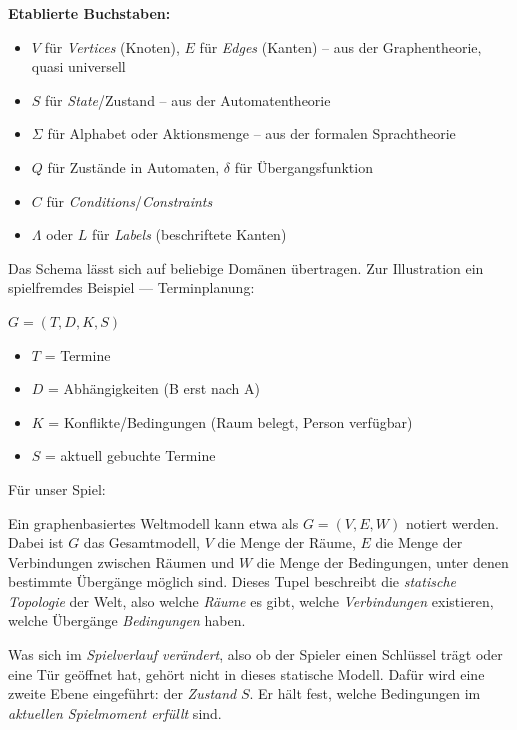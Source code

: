 \documentclass[parskip=half,a4paper,11pt]{scrreprt}
\begin{document}
\textbf{Etablierte Buchstaben:}

\begin{itemize}
    \item $V$ für \textit{Vertices} (Knoten), $E$ für \textit{Edges} (Kanten) – aus der Graphentheorie, quasi universell
    \item $S$ für \textit{State}/Zustand – aus der Automatentheorie
    \item $\Sigma$ für Alphabet oder Aktionsmenge – aus der formalen Sprachtheorie
    \item $Q$ für Zustände in Automaten, $\delta$ für Übergangsfunktion
    \item $C$ für \textit{Conditions}/\textit{Constraints}
    \item $\Lambda$ oder $L$ für \textit{Labels} (beschriftete Kanten)
\end{itemize}

\vspace{1cm}

Das Schema lässt sich auf beliebige Domänen übertragen. Zur Illustration ein spielfremdes Beispiel — Terminplanung:

$G = (T, D, K, S)$
\begin{itemize}
    \item $T$ = Termine
    \item $D$ = Abhängigkeiten (B erst nach A)
    \item $K$ = Konflikte/Bedingungen (Raum belegt, Person verfügbar)
    \item $S$ = aktuell gebuchte Termine
\end{itemize}

\vspace{1cm}

Für unser Spiel:

Ein graphenbasiertes Weltmodell kann etwa als $G=(V,E,W)$ notiert werden. Dabei ist $G$ das Gesamtmodell, $V$ die Menge der Räume, $E$ die Menge der Verbindungen zwischen Räumen und $W$ die Menge der Bedingungen, unter denen bestimmte Übergänge möglich sind. Dieses Tupel beschreibt die \textit{statische Topologie} der Welt, also welche \textit{Räume} es gibt, welche \textit{Verbindungen} existieren, welche Übergänge \textit{Bedingungen} haben.

Was sich im \textit{Spielverlauf verändert}, also ob der Spieler einen Schlüssel trägt oder eine Tür geöffnet hat, gehört nicht in dieses statische Modell. Dafür wird eine zweite Ebene eingeführt: der \textit{Zustand} $S$. Er hält fest, welche Bedingungen im \textit{aktuellen Spielmoment erfüllt} sind.
\end{document}
